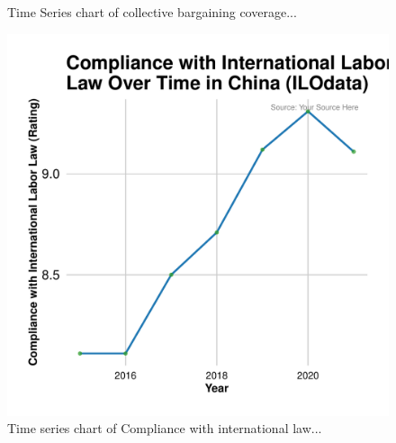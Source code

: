 \documentclass[11pt]{article}\usepackage[]{graphicx}\usepackage[]{xcolor}
\newenvironment{knitrout}{}{} %
\begin{document}
\begin{figure}[h!]
\begin{minipage}{0.48\linewidth}
\begin{knitrout}
{}


\end{knitrout}
    \caption{Time Series chart of collective bargaining coverage...}
    \label{fig:china-collective-bargaining}
  \end{minipage}
\end{figure}

\begin{figure}[h!]
  \centering
  \begin{minipage}{0.6\linewidth}
\begin{knitrout}
\color{fgcolor}

{\centering \includegraphics[width=0.7\linewidth]{figure/China_labor_compliance-1} 

}


\end{knitrout}
    \caption{Time series chart of Compliance with international law...}
    \label{fig:labor-compliance-china}
  \end{minipage}
\end{figure}
\end{document}
